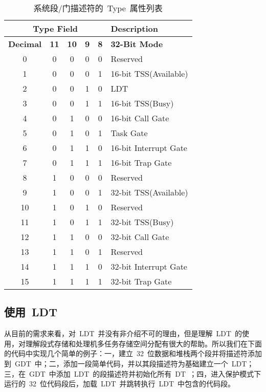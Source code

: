 \begin{itemize}
\begin{center}\begin{longtable}{c|c|c|c|c|l}
\caption[]{系统段/门描述符的~Type~属性列表}\label{sys_gate_types}\\
\hline
\multicolumn{5}{c|}{\textbf{Type Field}} & \textbf{Description}\bigstrut\\
\hline
\textbf{Decimal} & \textbf{11} & \textbf{10} & \textbf{9} & \textbf{8} & \textbf{32-Bit Mode}\\
\hline
0 & 0 & 0 & 0 & 0 & Reserved\\
1 & 0 & 0 & 0 & 1 & 16-bit TSS(Available)\\
2 & 0 & 0 & 1 & 0 & LDT\\
3 & 0 & 0 & 1 & 1 & 16-bit TSS(Busy)\\
4 & 0 & 1 & 0 & 0 & 16-bit Call Gate\\
5 & 0 & 1 & 0 & 1 & Task Gate\\
6 & 0 & 1 & 1 & 0 & 16-bit Interrupt Gate\\
7 & 0 & 1 & 1 & 1 & 16-bit Trap Gate\\
8 & 1 & 0 & 0 & 0 & Reserved\\
9 & 1 & 0 & 0 & 1 & 32-bit TSS(Available)\\
10 & 1 & 0 & 1 & 0 & Reserved\\
11 & 1 & 0 & 1 & 1 & 32-bit TSS(Busy)\\
12 & 1 & 1 & 0 & 0 & 32-bit Call Gate\\
13 & 1 & 1 & 0 & 1 & Reserved\\
14 & 1 & 1 & 1 & 0 & 32-bit Interrupt Gate\\
15 & 1 & 1 & 1 & 1 & 32-bit Trap Gate\\
\hline
\end{longtable}\end{center}

\end{itemize}

\subsection{使用~LDT~}

从目前的需求来看，对~LDT~并没有非介绍不可的理由，但是理解~LDT~的使用，对理解段式存储和处理机多任务存储空间分配有很大的帮助。所以我们在下面的代码中实现几个简单的例子：一，建立~32~位数据和堆栈两个段并将描述符添加到~GDT~中；二，添加一段简单代码，并以其段描述符为基础建立一个~LDT；三，在~GDT~中添加~LDT~的段描述符并初始化所有~DT~；四，进入保护模式下运行的~32~位代码段后，加载~LDT~并跳转执行~LDT~中包含的代码段。

